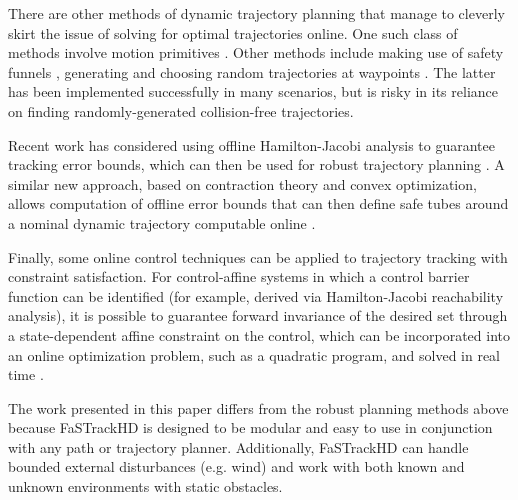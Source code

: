 There are other methods of dynamic trajectory planning that manage to cleverly skirt the issue of solving for optimal trajectories online.  One such class of methods involve motion primitives \cite{Gillula2010, Dey2016}. Other methods include making use of safety funnels \cite{Majumdar2016},  generating and choosing random trajectories at waypoints \cite{Kalakrishnan2011, Schwesinger2013}. The latter has been implemented successfully in many scenarios, but is risky in its reliance on finding randomly-generated collision-free trajectories. 

Recent work has considered using offline Hamilton-Jacobi analysis to guarantee tracking error bounds, which can then be used for robust trajectory planning \cite{Bansal2017}. A similar new approach, based on contraction theory and convex optimization, allows computation of offline error bounds that can then define safe tubes around a nominal dynamic trajectory computable online \cite{Singh2017}.

Finally, some online control techniques can be applied to trajectory tracking with constraint satisfaction. For control-affine systems in which a control barrier function can be identified (for example, derived via Hamilton-Jacobi reachability analysis), it is possible to guarantee forward invariance of the desired set through a state-dependent affine constraint on the control, which can be incorporated into an online optimization problem, such as a quadratic program, and solved in real time \cite{Ames2014}. %

The work presented in this paper differs from the robust planning methods above because FaSTrackHD is designed to be modular and easy to use in conjunction with any path or trajectory planner. Additionally, FaSTrackHD can handle bounded external disturbances (e.g. wind) and work with both known and unknown environments with static obstacles.